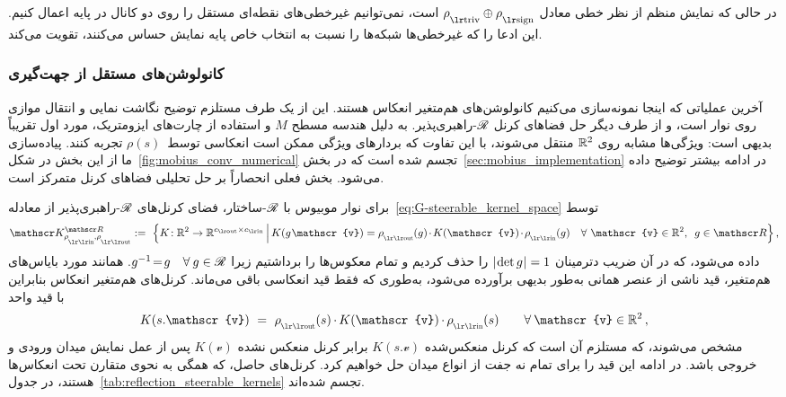 در حالی که نمایش منظم از نظر خطی معادل $\rhotriv\oplus\rhosign$ است، نمی‌توانیم غیرخطی‌های نقطه‌ای مستقل را روی دو کانال در پایه  اعمال کنیم.
این ادعا را که غیرخطی‌ها شبکه‌ها را نسبت به انتخاب خاص پایه نمایش حساس می‌کنند، تقویت می‌کند.

\subsubsection{کانولوشن‌های مستقل از جهت‌گیری}
\label{sec:mobius_kernel_spaces}

آخرین عملیاتی که اینجا نمونه‌سازی می‌کنیم کانولوشن‌های هم‌متغیر انعکاس هستند.
این از یک طرف مستلزم توضیح نگاشت نمایی و انتقال موازی روی نوار است، و از طرف دیگر حل فضاهای کرنل $\mathscr{R}$-راهبری‌پذیر.
به دلیل هندسه مسطح $M$ و استفاده از چارت‌های ایزومتریک، مورد اول تقریباً بدیهی است:
ویژگی‌ها مشابه روی $\mathbb{R}^2$ منتقل می‌شوند، با این تفاوت که بردارهای ویژگی ممکن است انعکاسی توسط~$\rho(s)$ تجربه کنند.
پیاده‌سازی ما از این بخش در شکل~\ref{fig:mobius_conv_numerical} تجسم شده است که در بخش~\ref{sec:mobius_implementation} در ادامه بیشتر توضیح داده می‌شود.
بخش فعلی انحصاراً بر حل تحلیلی فضاهای کرنل متمرکز است.

برای نوار موبیوس با $\mathscr{R}$-ساختار، فضای کرنل‌های $\mathscr{R}$-راهبری‌پذیر از معادله~\eqref{eq:G-steerable_kernel_space} توسط
\begin{align}
	\KR :=\ \Big\{ K\!: \R^2 \to \R^{\cout\times\cin} \,\Big|\,
	K(g\mkern1mu\mathscr{v}) = \rhoout(g) \mkern-2mu\cdot\mkern-2mu K(\mathscr{v}) \mkern-2mu\cdot\mkern-2mu \rhoin(g) \quad \forall\ \mathscr{v} \in \R^2,\,\ g\in \Flip \Big\} \,,
\end{align}
داده می‌شود، که در آن ضریب دترمینان $|\mkern-2mu \det g \mkern1mu|=1$ را حذف کردیم و تمام معکوس‌ها را برداشتیم زیرا ${g^{-1} \!=\! g\ \ \ \forall\mkern4mu g \in \Flip}$.
همانند مورد بایاس‌های هم‌متغیر، قید ناشی از عنصر همانی به‌طور بدیهی برآورده می‌شود، به‌طوری که فقط قید انعکاسی باقی می‌ماند.
کرنل‌های هم‌متغیر انعکاس بنابراین با قید واحد
\begin{align}
	K(s.\mathscr{v})\ =\ \rhoout(s) \mkern-1mu\cdot\mkern-1mu K(\mathscr{v}) \mkern-1mu\cdot\mkern-1mu \rhoin(s) \qquad \forall\: \mathscr{v} \in \R^2 \,,
\end{align}
مشخص می‌شوند، که مستلزم آن است که کرنل منعکس‌شده $K(s.\mathscr{v})$ برابر کرنل منعکس نشده $K(\mathscr{v})$ پس از عمل نمایش میدان ورودی و خروجی باشد.
در ادامه این قید را برای تمام نه جفت از انواع میدان حل خواهیم کرد.
کرنل‌های حاصل، که همگی به نحوی متقارن تحت انعکاس‌ها هستند، در جدول~\ref{tab:reflection_steerable_kernels} تجسم شده‌اند.


